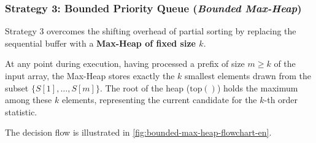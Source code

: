 \subsubsection{Strategy 3: Bounded Priority Queue (\textit{Bounded Max-Heap})}
Strategy 3 overcomes the shifting overhead of partial sorting by replacing the sequential buffer with a \textbf{Max-Heap of fixed size $k$}.

\begin{property}
At any point during execution, having processed a prefix of size $m \ge k$ of the input array, the Max-Heap stores exactly the $k$ smallest elements drawn from the subset $\{S[1], \dots, S[m]\}$. The root of the heap ($\text{top}()$) holds the maximum among these $k$ elements, representing the current candidate for the $k$-th order statistic.
\end{property}

The decision flow is illustrated in \autoref{fig:bounded-max-heap-flowchart-en}.

